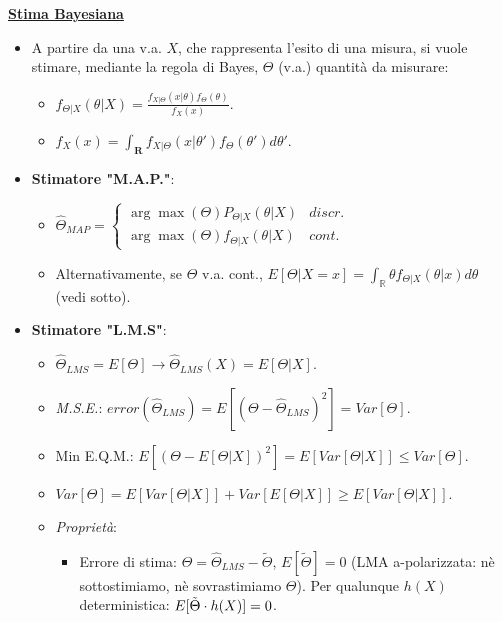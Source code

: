 \documentclass[8pt]{extarticle}
\begin{document}
\begin{multicols*}{3}
    \textbf{\underline{Stima Bayesiana}}
    \begin{itemize}
        \item A partire da una v.a. $X$, che rappresenta l'esito di una misura, si vuole stimare, mediante la regola di Bayes, $\Theta$ (v.a.) quantità da misurare:
              \begin{itemize}
                  \item $f_{\Theta|X}(\theta|X)=\frac{f_{X|\Theta}(x|\theta)f_{\Theta}(\theta)}{f_{X}(x)}$.
                  \item $f_{X}(x)=\int_{\mathbf{R}}f_{X|\Theta}(x|\theta')f_{\Theta}(\theta')d\theta'$.
              \end{itemize}
        \item \textbf{Stimatore "M.A.P."}:
              \begin{itemize}
                  \item $\hat{\Theta}_{MAP}=\begin{cases}
                                \arg\max{(\Theta)}P_{\Theta|X}(\theta|X) & discr. \\
                                \arg\max{(\Theta)}f_{\Theta|X}(\theta|X) & cont.
                            \end{cases}$
                  \item Alternativamente, se $\Theta$ v.a. cont., $E[\Theta|X=x]=\int_{\mathbb{R}}\theta f_{\Theta|X}(\theta|x)d\theta$ (vedi sotto).
              \end{itemize}
        \item \textbf{Stimatore "L.M.S"}:
              \begin{itemize}
                  \item $\hat{\Theta}_{LMS}=E[\Theta]\rightarrow\hat{\Theta}_{LMS}(X)=E[\Theta|X]$.
                  \item \textit{M.S.E.}: $error(\hat{\Theta}_{LMS})=E[(\Theta-\hat{\Theta}_{LMS})^{2}]=Var[\Theta]$.
                  \item Min E.Q.M.: $E[(\Theta-E[\Theta|X])^{2}]=E[Var[\Theta|X]]\leq Var[\Theta]$.
                  \item $Var[\Theta]=E[Var[\Theta|X]]+Var[E[\Theta|X]]\ge E[Var[\Theta|X]]$.
                  \item \textit{Proprietà}:
                        \begin{itemize}
                            \item Errore di stima: $\Theta=\hat{\Theta}_{LMS}-\widetilde{\Theta}$, $E[\widetilde{\Theta}]=0$ (LMA a-polarizzata: nè sottostimiamo, nè sovrastimiamo $\Theta$). \newline Per qualunque $h(X)$ deterministica: $E[\Tilde{\Theta}\cdot h(X)]=0$.

\end{itemize}
\end{itemize}
\end{itemize}
\end{multicols*}
\end{document}
